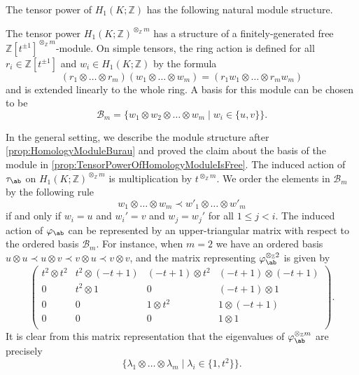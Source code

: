 \documentclass{amsart}
\begin{document}
The tensor power of $H_1(K;\mathbb{Z})$ has the following natural module structure.
\begin{fact}
\label{fact:BasisOfTensorPowerOfHomology}
The tensor power $H_1(K;\mathbb{Z})^{\otimes_{\mathbb{Z}}m}$ has a structure of a finitely-generated free $\mathbb{Z}[t^{\pm 1}]^{\otimes_\mathbb{Z} m}$-module. On simple tensors, the ring action is defined for all $r_i \in \mathbb{Z}[t^{\pm 1}]$ and $w_i \in H_1(K;\mathbb{Z})$ by the formula
\[
(r_1 \otimes \dots \otimes r_m)(w_1 \otimes \dots \otimes w_m) = (r_1 w_1 \otimes \dots \otimes r_m w_m)
\]
and is extended linearly to the whole ring. A basis for this module can be chosen to be
\begin{equation}
    \mathcal{B}_m = \{w_{1}\otimes w_{2} \otimes \dots \otimes w_{m} \mid w_{i} \in \{u,v\}\}.
\end{equation}    
\end{fact}
\noindent In the general setting, we describe the module structure after \cref{prop:HomologyModuleBurau} and proved the claim about the basis of the module in \cref{prop:TensorPowerOfHomologyModuleIsFree}. The induced action of $\tau_{\ab}$ on $H_1(K;\mathbb{Z})^{\otimes_{\mathbb{Z}}m}$ is multiplication by $t^{\otimes_{\mathbb{Z}}m}$. We order the elements in $\mathcal{B}_m$ by the following rule
\begin{equation}
\label{eq:OrderOnTheBasis}
w_1 \otimes \dots \otimes w_m \prec w'_1 \otimes \dots \otimes w'_m
\end{equation}
if and only if $w_i = u$ and $w_i' = v$ and $w_j = w_j'$ for all $1 \leq j < i$. The induced action of $\varphi_{\ab}$ can be represented by an upper-triangular matrix with respect to the ordered basis $\mathcal{B}_m$. For instance, when $m = 2$ we have an ordered basis $u \otimes u \prec u \otimes v \prec v \otimes u \prec v \otimes v$, and the matrix representing 
$\varphi_{\ab}^{\otimes_{\mathbb{Z}} 2}$ is given by
\[
\begin{pmatrix}
    t^2 \otimes t^2 & t^2 \otimes (-t+1) & (-t+1) \otimes t^2 & (-t+1) \otimes (-t+1) \\ 
    0 & t^2 \otimes 1 & 0 & (-t+1) \otimes 1 \\
    0 & 0 & 1 \otimes t^2 & 1 \otimes (-t+1) \\
    0 & 0 & 0 & 1 \otimes 1 \\
\end{pmatrix}. 
\]
It is clear from this matrix representation that the eigenvalues of $\varphi_{\ab}^{\otimes_{\mathbb{Z}} m}$ are precisely
\[
\{\lambda_1 \otimes \dots \otimes \lambda_m \mid \lambda_i \in \{1,t^2\}\}.
\]
\end{document}
